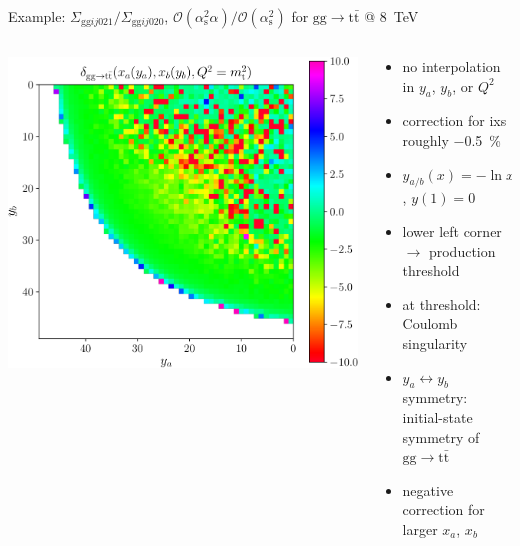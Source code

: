 \begin{frame}{Example: $\Sigma_{\mathrm{gg}ij021}/\Sigma_{\mathrm{gg}ij020}$, $\mathcal{O} (\alpha_\mathrm{s}^2 \alpha) / \mathcal{O} (\alpha_\mathrm{s}^2)$ for $\mathrm{g}\mathrm{g} \to \mathrm{t} \bar{\mathrm{t}}$ @ \SI{8}{\tera\electronvolt}}
\fontsize{9}{11}\selectfont
\begin{columns}[onlytextwidth]
\begin{column}{0.6\textwidth}
\includegraphics[height=0.73\textheight]{ew_corrections/figures/ttb-crop}
\end{column}
\begin{column}{0.4\textwidth}
\begin{itemize}
\item no interpolation in $y_a$, $y_b$, or $Q^2$
\item correction for ixs roughly \SI{-0.5}{\percent}
\item $y_{a/b}(x) = -\ln x_{a/b} + 5 (1-x_{a/b})$, $y(1) = 0$
\vspace*{0.25cm}
\item lower left corner $\rightarrow$ production threshold
\item at threshold: Coulomb singularity
\item $y_a \leftrightarrow y_b$ symmetry: initial-state symmetry of $\mathrm{g}\mathrm{g} \to \mathrm{t} \bar{\mathrm{t}}$
\item negative correction for larger $x_a$, $x_b$
\end{itemize}
\end{column}
\end{columns}
\end{frame}


